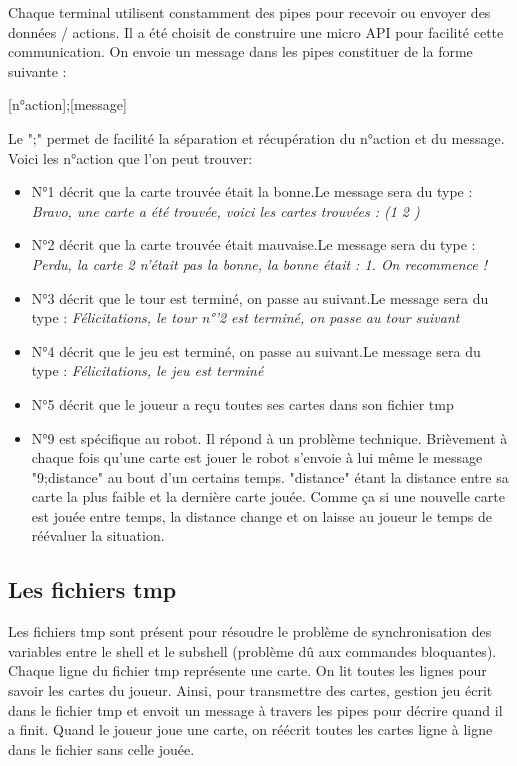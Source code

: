 \documentclass{article}
\begin{document}
Chaque terminal utilisent constamment des pipes pour recevoir ou envoyer des données / actions. Il a été choisit de construire une micro API pour facilité cette communication. On envoie un message dans les pipes constituer de la forme suivante :
\begin{center}
[n°action];[message]
\end{center}
Le ";" permet de facilité la séparation et récupération du n°action et du message. Voici les n°action que l'on peut trouver:
\begin{itemize}
	\item N°1 décrit que la carte trouvée était la bonne.\newline Le message sera du type : \textit{Bravo, une carte a été trouvée, voici les cartes trouvées : (1 2 )}
	\item N°2 décrit que la carte trouvée était mauvaise.\newline Le message sera du type : \textit{Perdu, la carte 2 n'était pas la bonne, la bonne était : 1. On recommence !}  
	\item N°3 décrit que le tour est terminé, on passe au suivant.\newline Le message sera du type : \textit{Félicitations, le tour n°'2 est terminé, on passe au tour suivant} 
	\item N°4 décrit que le jeu est terminé, on passe au suivant.\newline Le message sera du type : \textit{Félicitations, le jeu est terminé}
	\item N°5 décrit que le joueur a reçu toutes ses cartes dans son fichier tmp     
	\item N°9 est spécifique au robot. Il répond à un problème technique. Brièvement à chaque fois qu'une carte est jouer le robot s'envoie à lui même le message "9;distance" au bout d'un certains temps. "distance" étant la distance entre sa carte la plus faible et la dernière carte jouée. Comme ça si une nouvelle carte est jouée entre temps, la distance change et on laisse au joueur le temps de réévaluer la situation.  
\end{itemize}

\subsection{Les fichiers tmp}
Les fichiers tmp sont présent pour résoudre le problème de synchronisation des variables entre le shell et le subshell (problème dû aux commandes bloquantes). Chaque ligne du fichier tmp représente une carte. On lit toutes les lignes pour savoir les cartes du joueur. Ainsi, pour transmettre des cartes, gestion jeu écrit dans le fichier tmp et envoit un message à travers les pipes pour décrire quand il a finit. Quand le joueur joue une carte, on réécrit toutes les cartes ligne à ligne dans le fichier sans celle jouée.  
\end{document}
